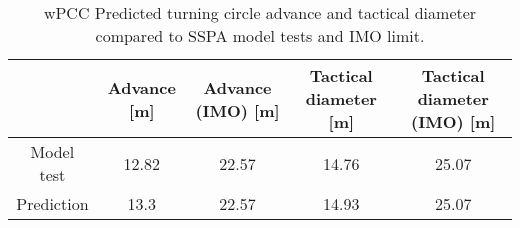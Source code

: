 \begin{table}[!htb]
    \footnotesize
    \caption{wPCC Predicted turning circle advance and tactical diameter compared to SSPA model tests and IMO limit.}
    \label{\detokenize{06.10_results_wpcc:tab-wpcc-advance}}
    \centering
    \begin{tabular}{|c|c|c|c|c|}
\hline
&

Advance {[}m{]}
&

Advance (IMO) {[}m{]}
&

Tactical diameter {[}m{]}
&

Tactical diameter (IMO) {[}m{]}
\\
\hline

Model test
&

12.82
&

22.57
&

14.76
&

25.07
\\

Prediction
&

13.3
&

22.57
&

14.93
&

25.07
\\
\hline
\end{tabular}

\end{table}

